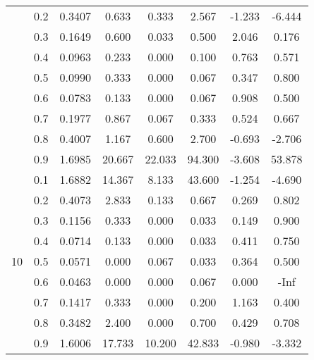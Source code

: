 \documentclass[11pt,a4paper]{report}
\begin{document}
\begin{longtable}{ | c | c || c | c | c | c | c | c | }
 & 0.2 & 0.3407 & 0.633 & 0.333 & 2.567 & -1.233 & -6.444 \\
 & 0.3 & 0.1649 & 0.600 & 0.033 & 0.500 & 2.046 & 0.176 \\
 & 0.4 & 0.0963 & 0.233 & 0.000 & 0.100 & 0.763 & 0.571 \\
 & 0.5 & 0.0990 & 0.333 & 0.000 & 0.067 & 0.347 & 0.800 \\
 & 0.6 & 0.0783 & 0.133 & 0.000 & 0.067 & 0.908 & 0.500 \\
 & 0.7 & 0.1977 & 0.867 & 0.067 & 0.333 & 0.524 & 0.667 \\
 & 0.8 & 0.4007 & 1.167 & 0.600 & 2.700 & -0.693 & -2.706 \\
 & 0.9 & 1.6985 & 20.667 & 22.033 & 94.300 & -3.608 & 53.878 \\
 \hline
\multirow{9}{*}{10} & 0.1 & 1.6882 & 14.367 & 8.133 & 43.600 & -1.254 & -4.690 \\
 & 0.2 & 0.4073 & 2.833 & 0.133 & 0.667 & 0.269 & 0.802 \\
 & 0.3 & 0.1156 & 0.333 & 0.000 & 0.033 & 0.149 & 0.900 \\
 & 0.4 & 0.0714 & 0.133 & 0.000 & 0.033 & 0.411 & 0.750 \\
 & 0.5 & 0.0571 & 0.000 & 0.067 & 0.033 & 0.364 & 0.500 \\
 & 0.6 & 0.0463 & 0.000 & 0.000 & 0.067 & 0.000 & -Inf \\
 & 0.7 & 0.1417 & 0.333 & 0.000 & 0.200 & 1.163 & 0.400 \\
 & 0.8 & 0.3482 & 2.400 & 0.000 & 0.700 & 0.429 & 0.708 \\
 & 0.9 & 1.6006 & 17.733 & 10.200 & 42.833 & -0.980 & -3.332 \\
 \hline
\hline
\end{longtable}
\end{document}

